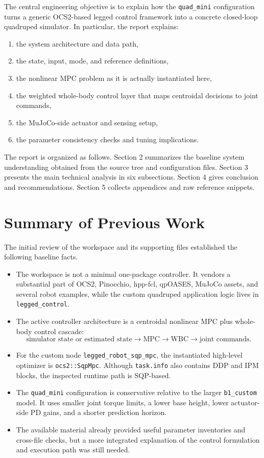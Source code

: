 \documentclass[11pt,a4paper]{article}
\newcommand{\code}[1]{\texttt{#1}}
\begin{document}
The central engineering objective is to explain how the \code{quad\_mini} configuration turns a generic OCS2-based legged
control framework into a concrete closed-loop quadruped simulator. In particular, the report explains:
\begin{enumerate}[leftmargin=*]
  \item the system architecture and data path,
  \item the state, input, mode, and reference definitions,
  \item the nonlinear MPC problem as it is actually instantiated here,
  \item the weighted whole-body control layer that maps centroidal decisions to joint commands,
  \item the MuJoCo-side actuator and sensing setup,
  \item the parameter consistency checks and tuning implications.
\end{enumerate}

The report is organized as follows. Section 2 summarizes the baseline system understanding obtained
from the source tree and configuration files. Section 3 presents the main technical analysis in six
subsections. Section 4 gives conclusion and recommendations. Section 5 collects appendices and raw
reference snippets.

\section{Summary of Previous Work}

The initial review of the workspace and its supporting files established the following baseline facts.

\begin{itemize}[leftmargin=*]
  \item The workspace is not a minimal one-package controller. It vendors a substantial part of OCS2, Pinocchio, hpp-fcl, qpOASES,
        MuJoCo assets, and several robot examples, while the custom quadruped application logic lives in \code{legged\_control}.
  \item The active controller architecture is a centroidal nonlinear MPC plus whole-body control cascade:
        \[
        \text{simulator state or estimated state} \rightarrow \text{MPC} \rightarrow \text{WBC} \rightarrow \text{joint commands}.
        \]
  \item For the custom node \code{legged\_robot\_sqp\_mpc}, the instantiated high-level optimizer is \code{ocs2::SqpMpc}. Although
        \code{task.info} also contains DDP and IPM blocks, the inspected runtime path is SQP-based.
  \item The \code{quad\_mini} configuration is conservative relative to the larger \code{b1\_custom} model. It uses smaller joint torque
        limits, a lower base height, lower actuator-side PD gains, and a shorter prediction horizon.
  \item The available material already provided useful parameter inventories and cross-file checks, but a more integrated explanation of
        the control formulation and execution path was still needed.
\end{itemize}
\end{document}
